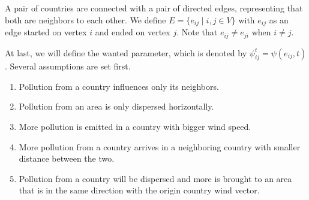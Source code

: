 \documentclass[a4paper,fleqn]{cas-dc}
\begin{document}
A pair of countries are connected with a pair of directed edges, representing that both are neighbors to each other. We define $E=\{e_{ij} \mid i,j\in V\}$ with $e_{ij}$ as an edge started on vertex $i$ and ended on vertex $j$. Note that $e_{ij}\neq e_{ji}$ when $i\neq j$.

At last, we will define the wanted parameter, which is denoted by $\psi_{ij}^t=\psi(e_{ij},t)$. Several assumptions are set first.
\begin{enumerate}
    \item Pollution from a country influences only its neighbors.
    \item Pollution from an area is only dispersed horizontally.
    \item More pollution is emitted in a country with bigger wind speed.
    \item More pollution from a country arrives in a neighboring country with smaller distance between the two.
    \item Pollution from a country will be dispersed and more is brought to an area that is in the same direction with the origin country wind vector.
\end{enumerate}
\end{document}
